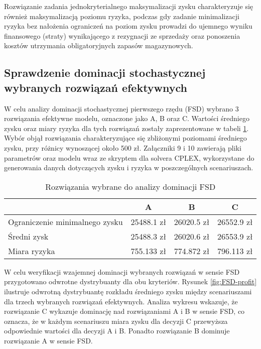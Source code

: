 \documentclass[11pt,a4paper]{article}
\begin{document}
Rozwiązanie zadania jednokryterialnego maksymalizacji zysku charakteryzuje się również maksymalizacją poziomu ryzyka, podczas gdy zadanie minimalizacji ryzyka bez nałożenia ograniczeń na poziom zysku prowadzi do ujemnego wyniku finansowego (straty) wynikającego z rezygnacji ze sprzedaży oraz ponoszenia kosztów utrzymania obligatoryjnych zapasów magazynowych.

\subsection{Sprawdzenie dominacji stochastycznej wybranych rozwiązań efektywnych}

W celu analizy dominacji stochastycznej pierwszego rzędu (FSD) wybrano 3 rozwiązania efektywne modelu, oznaczone jako A, B oraz C. Wartości średniego zysku oraz miary ryzyka dla tych rozwiązań zostały zaprezentowane w tabeli \ref{tab:abc}. Wybór objął rozwiązania charakteryzujące się zbliżonymi poziomami średniego zysku, przy różnicy wynoszącej około 500 zł. Załączniki 9 i 10 zawierają pliki parametrów oraz modelu wraz ze skryptem dla solvera CPLEX, wykorzystane do generowania danych dotyczących zysku i ryzyka w poszczególnych scenariuszach.

\begin{table}[ht!]
  \label{tab:abc}
  \caption{Rozwiązania wybrane do analizy dominacji FSD}
  \centering
  \begin{tabular}{lccc}
  	\hline
              			& A & B & C \\
	\hline
	Ograniczenie minimalnego zysku	& 25488.1 zł & 26020.5 zł & 26552.9 zł\\
	Średni zysk   	& 25488.3 zł & 26020.6 zł & 26553.9 zł\\
	Miara ryzyka   	& 755.133 zł & 774.872 zł & 796.113 zł\\ 
	\hline
	\end{tabular}
\end{table}


W celu weryfikacji wzajemnej dominacji wybranych rozwiązań w sensie FSD przygotowano odwrotne dystrybuanty dla obu kryteriów. Rysunek \ref{fig:FSD-profit} ilustruje odwrotną dystrybuantę rozkładu średniego zysku między scenariuszami dla trzech wybranych rozwiązań efektywnych. Analiza wykresu wskazuje, że rozwiązanie C wykazuje dominację nad rozwiązaniami A i B w sensie FSD, co oznacza, że w każdym scenariuszu miara zysku dla decyzji C przewyższa odpowiednie wartości dla decyzji A i B. Ponadto rozwiązanie B dominuje rozwiązanie A w sensie FSD.
\end{document}
